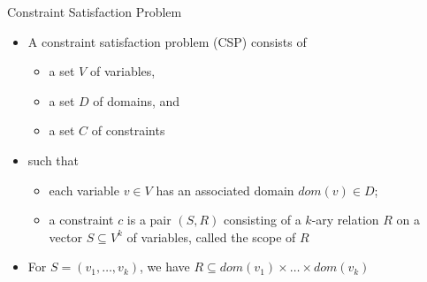 \begin{frame}{Constraint Satisfaction Problem}
  \bigskip
  \begin{itemize}
  \item<1-> A \alert{constraint satisfaction problem} (CSP) consists of
    \begin{itemize}
    \item a set $V$ of variables,
    \item a set $D$ of domains, and
    \item a set $C$ of constraints
    \end{itemize}
  \item<2-> [] such that
    \begin{itemize}
    \item each \alert{variable} $v\in V$ has an associated \alert{domain} $\mathit{dom}(v)\in D$\/;
    \item a \alert{constraint} $c$ is a pair
      \(
      (S,R)
      \)
      consisting of a $k$-ary \alert{relation} $R$
      on a vector $S\subseteq V^k$ of variables,
      called the \alert{scope} of $R$
    \end{itemize}
    \medskip
  \item<3-> 
    For $S=(v_1,\dots,v_k)$,
    we have
    \(
    R\subseteq\mathit{dom}(v_1)\times\dots\times\mathit{dom}(v_k)
    \)
  \end{itemize}
\end{frame}
